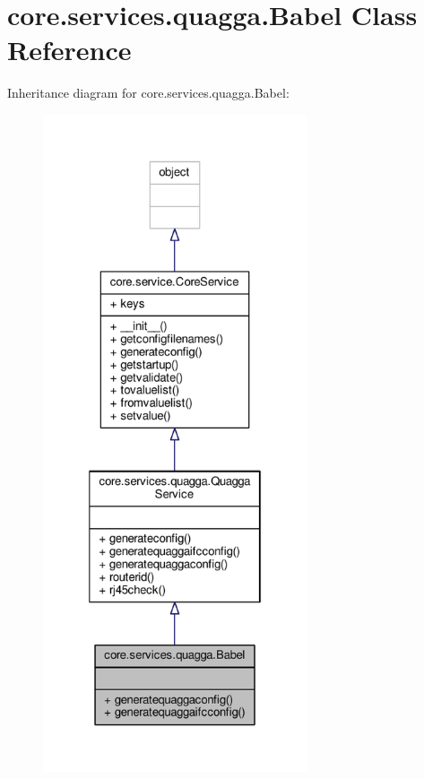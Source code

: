 \hypertarget{classcore_1_1services_1_1quagga_1_1_babel}{\section{core.\+services.\+quagga.\+Babel Class Reference}
\label{classcore_1_1services_1_1quagga_1_1_babel}
}


Inheritance diagram for core.\+services.\+quagga.\+Babel\+:
\nopagebreak
\begin{figure}[H]
\begin{center}
\leavevmode
\includegraphics[height=550pt]{classcore_1_1services_1_1quagga_1_1_babel__inherit__graph}
\end{center}
\end{figure}


